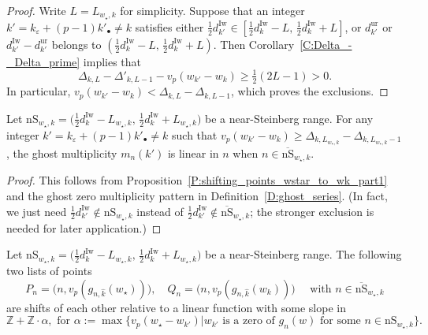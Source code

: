 \begin{proof}
    Write $L = L_{w_\star, k}$ for simplicity. Suppose that an integer $k' = k_\varepsilon + (p-1)k'_\bullet \neq k$ satisfies either $\frac 12d_{k'}^{\mathrm{Iw}}\in [\frac 12 d_k^{\mathrm{Iw}}- L, \, \frac 12 d_k^{\mathrm{Iw}}+L]$, or $d_{k'}^{\mathrm{ur}}$ or $d_{k'}^{\mathrm{Iw}}-d_{k'}^{\mathrm{ur}}$ belongs to $(\frac 12 d_k^{\mathrm{Iw}}- L, \, \frac 12 d_k^{\mathrm{Iw}}+L)$. Then Corollary~\ref{C:Delta_-_Delta_prime} implies that
    $$
    \Delta_{k, L}-\Delta'_{k, L-1} - v_p(w_{k'}-w_k) \geq \tfrac 12(2L-1)  >0.
    $$
    In particular, $v_p(w_{k'}-w_k) < \Delta_{k,L} - \Delta_{k, L-1}$, which proves the exclusions.
\end{proof}

\begin{proposition}
    \label{P:shifting_points_wstar_to_wk_part2}
    Let $ {\mathrm{nS}}_{w_\star, k} = \big(\tfrac 12 d_{k}^{\mathrm{Iw}}- L_{w_\star, k},\, \tfrac 12 d_{k}^{\mathrm{Iw}}+ L_{ w_\star, k} \big)$ be a  near-Steinberg range.
    For any integer $k' = k_\varepsilon + (p-1)k'_\bullet \neq k $ such that
    $v_p(w_{k'}-w_k) \geq  \Delta_{k, L_{ w_\star, k}} - \Delta_{k, L_{ w_\star, k}-1}$, the ghost multiplicity $m_n(k')$ is linear in $n$ when $n \in \overline {\mathrm{nS}}_{w_\star, k}$.
\end{proposition}

\begin{proof}
    This follows from Proposition~\ref{P:shifting_points_wstar_to_wk_part1} and the ghost zero multiplicity pattern in Definition~\ref{D:ghost_series}. (In fact, we just need $\frac 12 d_{k'}^{\mathrm{Iw}}\notin {\mathrm{nS}}_{w_\star, k}$ instead of $\frac 12 d_{k'}^{\mathrm{Iw}}\notin \overline{\mathrm{nS}}_{w_\star, k}$; the stronger exclusion is needed for later application.)
\end{proof}

\begin{proposition}
    \label{P:shifting_points_wstar_to_wk_part3}
    Let $ {\mathrm{nS}}_{w_\star, k} = \big(\tfrac 12 d_{k}^{\mathrm{Iw}}- L_{w_\star, k},\, \tfrac 12 d_{k}^{\mathrm{Iw}}+ L_{ w_\star, k} \big)$ be a  near-Steinberg range.
    The following two lists of points
    $$
    P_n = \big(n, v_p(g_{n,\hat k}(w_\star))\big), \quad Q_n = \big(n, v_p(g_{n,\hat k}(w_k))\big)  \quad \textrm{ with }n \in \overline{\mathrm{nS}}_{w_\star,k}
    $$
    are shifts of each other relative to a linear function with some slope in
    \begin{equation}
    \label{E:possible_shift_slopes}
    {\mathbb{Z}}+ {\mathbb{Z}}\cdot\alpha, \text{~for~} \alpha:= \max \{ v_p(w_\star - w_{k'})| w_{k'} \text{~is a zero of~} g_n(w) \text{~for some~} n\in {\mathrm{nS}}_{w_\star,k} \} .
    \end{equation}
\end{proposition}

